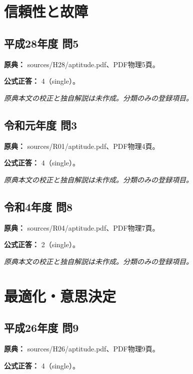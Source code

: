 \section{信頼性と故障}

\subsection{平成28年度 問5}
\label{q:h28-reg-apt-05}

\noindent\textbf{原典：} sources/H28/aptitude.pdf、PDF物理5頁。

\textbf{公式正答：} 4（single）。

\par\textit{原典本文の校正と独自解説は未作成。分類のみの登録項目。}

\subsection{令和元年度 問3}
\label{q:r01-reg-apt-03}

\noindent\textbf{原典：} sources/R01/aptitude.pdf、PDF物理4頁。

\textbf{公式正答：} 4（single）。

\par\textit{原典本文の校正と独自解説は未作成。分類のみの登録項目。}

\subsection{令和4年度 問8}
\label{q:r04-reg-apt-08}

\noindent\textbf{原典：} sources/R04/aptitude.pdf、PDF物理7頁。

\textbf{公式正答：} 2（single）。

\par\textit{原典本文の校正と独自解説は未作成。分類のみの登録項目。}

\section{最適化・意思決定}

\subsection{平成26年度 問9}
\label{q:h26-reg-apt-09}

\noindent\textbf{原典：} sources/H26/aptitude.pdf、PDF物理9頁。

\textbf{公式正答：} 4（single）。

